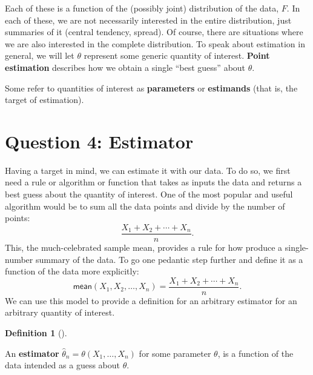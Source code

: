 \documentclass[
  13pt,
  letterpaper,
  DIV=11,
  numbers=noendperiod]{scrreprt}
\theoremstyle{definition}
\newtheorem{definition}{Definition}[chapter]
\theoremstyle{definition}
\theoremstyle{plain}
\theoremstyle{remark}
\begin{document}
Each of these is a function of the (possibly joint) distribution of the
data, \(F\). In each of these, we are not necessarily interested in the
entire distribution, just summaries of it (central tendency, spread). Of
course, there are situations where we are also interested in the
complete distribution. To speak about estimation in general, we will let
\(\theta\) represent some generic quantity of interest. \textbf{Point
estimation} describes how we obtain a single ``best guess'' about
\(\theta\).

\begin{tcolorbox}[enhanced jigsaw, leftrule=.75mm, colbacktitle=quarto-callout-note-color!10!white, title=\textcolor{quarto-callout-note-color}{\faInfo}\hspace{0.5em}{Note}, toptitle=1mm, breakable, left=2mm, toprule=.15mm, arc=.35mm, opacitybacktitle=0.6, opacityback=0, colback=white, rightrule=.15mm, titlerule=0mm, colframe=quarto-callout-note-color-frame, bottomtitle=1mm, bottomrule=.15mm, coltitle=black]

Some refer to quantities of interest as \textbf{parameters} or
\textbf{estimands} (that is, the target of estimation).

\end{tcolorbox}

\section{Question 4: Estimator}\label{question-4-estimator-1}

Having a target in mind, we can estimate it with our data. To do so, we
first need a rule or algorithm or function that takes as inputs the data
and returns a best guess about the quantity of interest. One of the most
popular and useful algorithm would be to sum all the data points and
divide by the number of points: \[
\frac{X_1 + X_2 + \cdots + X_n}{n}.
\] This, the much-celebrated sample mean, provides a rule for how
produce a single-number summary of the data. To go one pedantic step
further and define it as a function of the data more explicitly: \[
\textsf{mean}(X_1, X_2, \ldots, X_n) = \frac{X_1 + X_2 + \cdots + X_n}{n}.
\] We can use this model to provide a definition for an arbitrary
estimator for an arbitrary quantity of interest.

\begin{definition}[]\protect\hypertarget{def-estimator}{}\label{def-estimator}

An \textbf{estimator} \(\widehat{\theta}_n = \theta(X_1, \ldots, X_n)\)
for some parameter \(\theta\), is a function of the data intended as a
guess about \(\theta\).

\end{definition}
\end{document}
